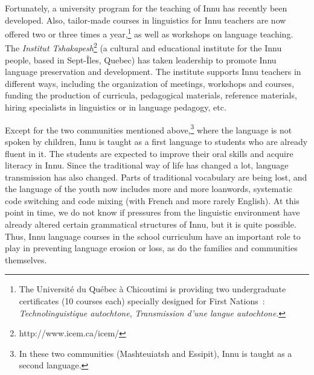 \documentclass[letterpaper]{article}
\begin{document}
 Fortunately, a university program for the teaching of Innu  has recently been developed. Also, tailor-made courses in linguistics for Innu teachers are now offered two or three times a year,\footnote{ The Universit\'e du Qu\'ebec \`a Chicoutimi is providing two undergraduate certificates (10 courses each) specially designed for First Nations~: \textit{Technolinguistique autochtone}, \textit{Transmission d{\textquoteright}une langue autochtone}.}  as well as workshops on language teaching. The \textit{Institut Tshakapesh}\footnote{ http://www.icem.ca/icem/} (a cultural and educational institute for the Innu people, based in Sept-\^Iles, Quebec) has taken leadership to promote Innu language preservation and development. The institute supports Innu teachers in different ways, including the organization of meetings, workshops and courses, funding the production of curricula, pedagogical materials, reference materials, hiring specialists in linguistics or in language pedagogy, etc.

Except for the two communities mentioned above,\footnote{ In these two communities (Mashteuiatsh and Essipit), Innu is taught as a second language.} where the language is not spoken by children, Innu is taught as a first language to students who are already fluent in it. The students are expected to improve their oral skills and acquire literacy in Innu. Since the traditional way of life has changed a lot, language transmission has also changed. Parts of traditional vocabulary are being lost, and the language of the youth now includes more and more loanwords, systematic code switching and code mixing (with French and more rarely English). At this point in time, we do not know if pressures from the linguistic environment have already altered certain grammatical structures of Innu, but it is quite possible. Thus, Innu language courses in the school curriculum have an important role to play in preventing language erosion or loss, as do the families and communities themselves. 
\end{document}
